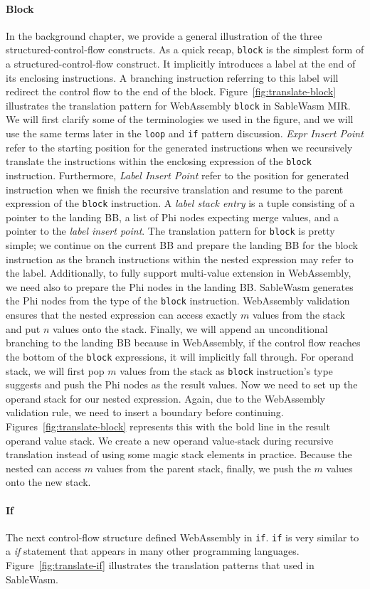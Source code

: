 \paragraph{Block} In the background chapter, we provide a general illustration of the three structured-control-flow constructs.  As a quick recap, \texttt{block} is the simplest form of a structured-control-flow construct. It implicitly introduces a label at the end of its enclosing instructions. A branching instruction referring to this label will redirect the control flow to the end of the block. Figure~\ref{fig:translate-block} illustrates the translation pattern for WebAssembly \texttt{block} in SableWasm MIR.  We will first clarify some of the terminologies we used in the figure, and we will use the same terms later in the \texttt{loop} and \texttt{if} pattern discussion. \emph{Expr Insert Point} refer to the starting position for the generated instructions when we recursively translate the instructions within the enclosing expression of the \texttt{block} instruction. Furthermore, \emph{Label Insert Point} refer to the position for generated instruction when we finish the recursive translation and resume to the parent expression of the \texttt{block} instruction. A \emph{label stack entry} is a tuple consisting of a pointer to the landing BB, a list of Phi nodes expecting merge values, and a pointer to the \emph{label insert point}. The translation pattern for \texttt{block} is pretty simple; we continue on the current BB and prepare the landing BB for the block instruction as the branch instructions within the nested expression may refer to the label. Additionally, to fully support multi-value extension in WebAssembly, we need also to prepare the Phi nodes in the landing BB. SableWasm generates the Phi nodes from the type of the \texttt{block} instruction. WebAssembly validation ensures that the nested expression can access exactly $m$ values from the stack and put $n$ values onto the stack. Finally, we will append an unconditional branching to the landing BB because in WebAssembly, if the control flow reaches the bottom of the \texttt{block} expressions, it will implicitly fall through. For operand stack, we will first pop $m$ values from the stack as \texttt{block} instruction's type suggests and push the Phi nodes as the result values. Now we need to set up the operand stack for our nested expression. Again, due to the WebAssembly validation rule, we need to insert a boundary before continuing. Figures~\ref{fig:translate-block} represents this with the bold line in the result operand value stack. We create a new operand value-stack during recursive translation instead of using some magic stack elements in practice.  Because the nested can access $m$ values from the parent stack, finally, we push the $m$ values onto the new stack.


\paragraph{If} The next control-flow structure defined WebAssembly in \texttt{if}. \texttt{if} is very similar to a \emph{if} statement that appears in many other programming languages. Figure~\ref{fig:translate-if} illustrates the translation patterns that used in SableWasm.
